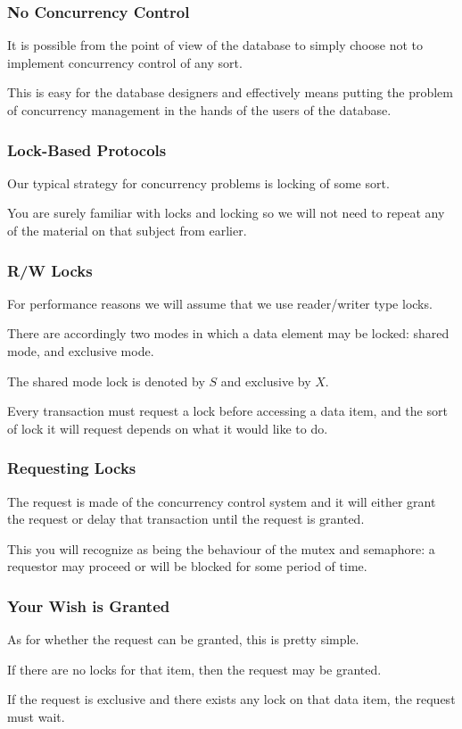 \begin{frame}
\frametitle{No Concurrency Control}

It is possible from the point of view of the database to simply choose not to implement concurrency control of any sort. 

This is easy for the database designers and effectively means putting the problem of concurrency management in the hands of the users of the database.

\end{frame}

\begin{frame}
\frametitle{Lock-Based Protocols}

Our typical strategy for concurrency problems is locking of some sort. 

You are surely familiar with locks and locking so we will not need to repeat any of the material on that subject from earlier. 

\end{frame}

\begin{frame}
\frametitle{R/W Locks}

For performance reasons we will assume that we use reader/writer type locks. 

There are accordingly two modes in which a data element may be locked: shared mode, and exclusive mode. 

The shared mode lock is denoted by $S$ and exclusive by $X$. 


Every transaction must request a lock before accessing a data item, and the sort of lock it will request depends on what it would like to do.


\end{frame}

\begin{frame}
\frametitle{Requesting Locks}

 The request is made of the concurrency control system and it will either grant the request or delay that transaction until the request is granted.
 
 This you will recognize as being the behaviour of the mutex and semaphore: a requestor may proceed or will be blocked for some period of time.

\end{frame}

\begin{frame}
\frametitle{Your Wish is Granted}

As for whether the request can be granted, this is pretty simple. 

If there are no locks for that item, then the request may be granted. 

If the request is exclusive and there exists any lock on that data item, the request must wait. 


\end{frame}

